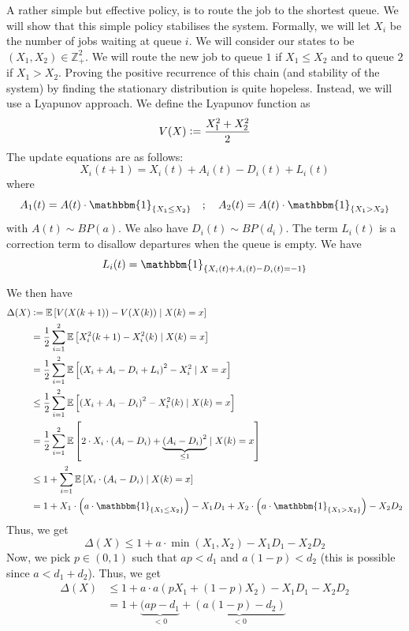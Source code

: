 \documentclass[12pt]{article}
\theoremstyle{definition}
\begin{document}
    A rather simple but effective policy, is to route the job to the shortest queue. We will show that this simple policy stabilises the system. Formally, we will let $X_i$ be the number of jobs waiting at queue $i$. We will consider our states to be $(X_1, X_2) \in \mathbb{Z}_+^2$. We will route the new job to queue $1$ if $X_1 \leq X_2$ and to queue $2$ if $X_1 > X_2$. Proving the positive recurrence of this chain (and stability of the system) by finding the stationary distribution is quite hopeless. Instead, we will use a Lyapunov approach. We define the Lyapunov function as 
    \[
        V(X) \vcentcolon= \frac{X_1^2 + X_2^2}{2}
    \]
    The update equations are as follows:
    \[
    X_i(t+1) = X_i(t) + A_i(t) - D_i(t) + L_i(t)
    \]
    where
    \[
        A_1(t) = A(t) \cdot \mathbbm{1}_{\left\{X_1 \leq X_2\right\}} \quad ; \quad A_2(t) = A(t) \cdot \mathbbm{1}_{\left\{X_1 > X_2\right\}}
    \]
    with $A(t) \sim BP(a)$. We also have $D_i(t) \sim BP(d_i)$. The term $L_i(t)$ is a correction term to disallow departures when the queue is empty. We have
    \[
        L_i(t) = \mathbbm{1}_{\left\{X_i(t) + A_i(t) - D_i(t) = -1\right\}}
    \]
    
    We then have
    \begin{align*}
        \Delta(X) &\vcentcolon= \mathbb{E} \left[ V(X(k+1)) - V(X(k)) \mid X(k) = x \right] \\
        &= \frac{1}{2} \sum_{i=1}^2 \mathbb{E} \left[ X_i^2(k+1) - X_i^2(k) \mid X(k) = x \right] \\
        &= \frac{1}{2} \sum_{i=1}^2 \mathbb{E} \left[ \left( X_i + A_i - D_i + L_i \right)^2 - X_i^2 \mid X = x \right] \\
        &\leq \frac{1}{2} \sum_{i=1}^2 \mathbb{E} \left[ \left( X_i + A_i - D_i \right)^2 - X_i^2(k) \mid X(k) = x \right] \\
        &= \frac{1}{2} \sum_{i=1}^2 \mathbb{E} \left[ 2 \cdot X_i \cdot (A_i - D_i) + \underbrace{\left(A_i - D_i\right)^2}_{\leq 1} \mid X(k) = x \right] \\
        &\leq 1 + \sum_{i=1}^2 \mathbb{E} \left[ X_i \cdot \left( A_i - D_i \right) \mid X(k) = x \right] \\
        &= 1 + X_1 \cdot \left( a \cdot \mathbbm{1}_{\left\{ X_1 \leq X_2 \right\}} \right) - X_1 D_1 + X_2 \cdot \left( a \cdot \mathbbm{1}_{\left\{ X_1 > X_2 \right\}} \right) - X_2 D_2
    \end{align*}
    Thus, we get
    \[
        \Delta(X) \leq 1 + a \cdot \min\left( X_1, X_2 \right) - X_1 D_1 -  X_2 D_2
    \]
    Now, we pick $p \in (0,1)$ such that $ap < d_1$ and $a(1-p) < d_2$ (this is possible since $a < d_1 + d_2$). Thus, we get
    \begin{align*}
        \Delta(X) &\leq 1 + a \cdot a \left( pX_1 + (1-p)X_2 \right) - X_1D_1 - X_2D_2 \\
        &= 1 + \underbrace{(ap-d_1}_{< 0} + \underbrace{\left( a(1-p) - d_2 \right)}_{<0}
    \end{align*}
    
\end{document}
